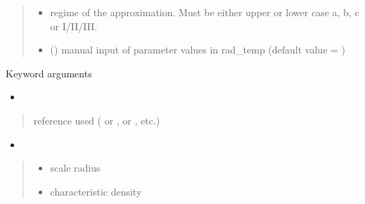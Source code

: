 \documentclass[letterpaper,10pt,english]{sphinxmanual}
\begin{document}
\begin{fulllineitems}
\begin{quote}
\begin{description}
\begin{itemize}
\item {} 
\sphinxAtStartPar
{} \textendash{} regime of the approximation. Must be either upper or lower case a, b, c or I/II/III.

\item {} 
\sphinxAtStartPar
{} () \textendash{} manual input of parameter values in rad\_temp (default value = )

\end{itemize}

\end{description}\end{quote}

\sphinxAtStartPar
Keyword arguments
\begin{itemize}
\item {} 
\sphinxAtStartPar
{}

\end{itemize}
\begin{quote}\begin{description}
\sphinxAtStartPar
{} \textendash{} reference used ( or \sphinxcode{\sphinxupquote{\textquotesingle{}1309.2641\textquotesingle{}}},  or \sphinxcode{\sphinxupquote{\textquotesingle{}1408.0002\textquotesingle{}}}, etc.)

\end{description}\end{quote}
\begin{itemize}
\item {} 
\sphinxAtStartPar
{}

\end{itemize}
\begin{quote}\begin{description}
\begin{itemize}
\item {} 
\sphinxAtStartPar
{} \textendash{} scale radius

\item {} 
\sphinxAtStartPar
{} \textendash{} characteristic density


\end{itemize}
\end{description}
\end{quote}
\end{fulllineitems}
\end{document}
